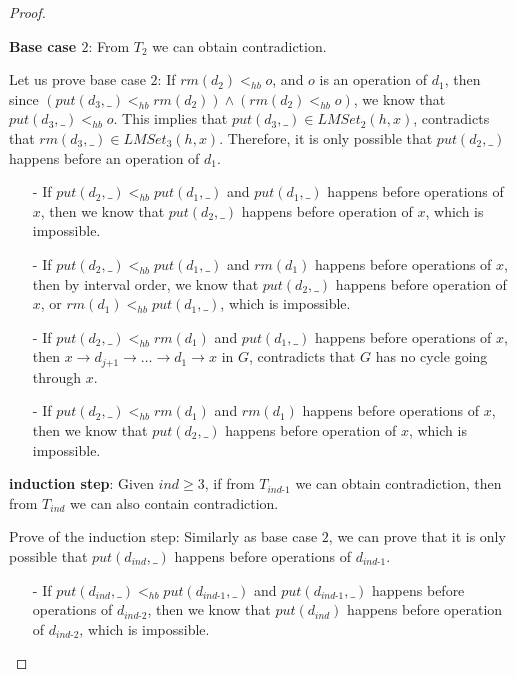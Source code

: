 \documentclass{llncs}
\begin{document}
\begin {proof}
\begin{itemize}
    {\bf Base case $2$}: From $T_2$ we can obtain contradiction.

    Let us prove base case $2$: If $\textit{rm}(d_2) <_{hb} o$, and $o$ is an operation of $d_1$, then since $( \textit{put}(d_3,\_) <_{hb} \textit{rm}(d_2) ) \wedge ( \textit{rm}(d_2) <_{hb} o )$, we know that $\textit{put}(d_3,\_) <_{hb} o$. This implies that $\textit{put}(d_3,\_) \in \textit{LMSet}_2(h,x)$, contradicts that $\textit{rm}(d_3,\_) \in \textit{LMSet}_3(h,x)$. Therefore, it is only possible that $\textit{put}(d_2,\_)$ happens before an operation of $d_1$.

    \begin{itemize}
    \setlength{\itemsep}{0.5pt}
    \item[-] If $\textit{put}(d_2,\_) <_{hb} \textit{put}(d_1,\_)$ and $\textit{put}(d_1,\_)$ happens before operations of $x$, then we know that $\textit{put}(d_2,\_)$ happens before operation of $x$, which is impossible.

    \item[-] If $\textit{put}(d_2,\_) <_{hb} \textit{put}(d_1,\_)$ and $\textit{rm}(d_1)$ happens before operations of $x$, then by interval order, we know that $\textit{put}(d_2,\_)$ happens before operation of $x$, or $\textit{rm}(d_1) <_{hb} \textit{put}(d_1,\_)$, which is impossible.

    \item[-] If $\textit{put}(d_2,\_) <_{hb} \textit{rm}(d_1)$ and $\textit{put}(d_1,\_)$ happens before operations of $x$, then $x \rightarrow d_{\textit{j+1}} \rightarrow \ldots \rightarrow d_1 \rightarrow x$ in $G$, contradicts that $G$ has no cycle going through $x$.

    \item[-] If $\textit{put}(d_2,\_) <_{hb} \textit{rm}(d_1)$ and $\textit{rm}(d_1)$ happens before operations of $x$, then we know that $\textit{put}(d_2,\_)$ happens before operation of $x$, which is impossible.
    \end{itemize}

    {\bf induction step}: Given $\textit{ind} \geq 3$, if from $T_{\textit{ind-1}}$ we can obtain contradiction, then from $T_{\textit{ind}}$ we can also contain contradiction.


    Prove of the induction step: Similarly as base case $2$, we can prove that it is only possible that $\textit{put}(d_{\textit{ind}},\_)$ happens before operations of $d_{\textit{ind-1}}$.

    \begin{itemize}
    \setlength{\itemsep}{0.5pt}
    \item[-] If $\textit{put}(d_{\textit{ind}},\_) <_{hb} \textit{put}(d_{\textit{ind-1}},\_)$ and $\textit{put}(d_{\textit{ind-1}},\_)$ happens before operations of $d_{\textit{ind-2}}$, then we know that $\textit{put}(d_{\textit{ind}})$ happens before operation of $d_{\textit{ind-2}}$, which is impossible.


\end{itemize}
\end{itemize}
\end{proof}
\end{document}
